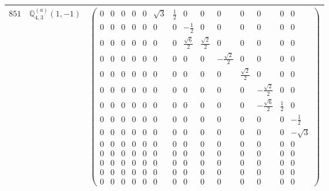 \documentclass[fleqn,8pt,landscape]{jsarticle}
\begin{document}
\begin{center}
\begin{longtable}{ccc}
$ 851 $ & $ \mathbb{Q}_{4,3}^{(a)}(1,-1) $ & $ \begin{pmatrix} 0 & 0 & 0 & 0 & 0 & \sqrt{3} & \frac{1}{2} & 0 & 0 & 0 & 0 & 0 & 0 & 0 \\ 0 & 0 & 0 & 0 & 0 & 0 & 0 & - \frac{1}{2} & 0 & 0 & 0 & 0 & 0 & 0 \\ 0 & 0 & 0 & 0 & 0 & 0 & 0 & \frac{\sqrt{6}}{2} & \frac{\sqrt{2}}{2} & 0 & 0 & 0 & 0 & 0 \\ 0 & 0 & 0 & 0 & 0 & 0 & 0 & 0 & 0 & - \frac{\sqrt{2}}{2} & 0 & 0 & 0 & 0 \\ 0 & 0 & 0 & 0 & 0 & 0 & 0 & 0 & 0 & 0 & \frac{\sqrt{2}}{2} & 0 & 0 & 0 \\ 0 & 0 & 0 & 0 & 0 & 0 & 0 & 0 & 0 & 0 & 0 & - \frac{\sqrt{2}}{2} & 0 & 0 \\ 0 & 0 & 0 & 0 & 0 & 0 & 0 & 0 & 0 & 0 & 0 & - \frac{\sqrt{6}}{2} & \frac{1}{2} & 0 \\ 0 & 0 & 0 & 0 & 0 & 0 & 0 & 0 & 0 & 0 & 0 & 0 & 0 & - \frac{1}{2} \\ 0 & 0 & 0 & 0 & 0 & 0 & 0 & 0 & 0 & 0 & 0 & 0 & 0 & - \sqrt{3} \\ 0 & 0 & 0 & 0 & 0 & 0 & 0 & 0 & 0 & 0 & 0 & 0 & 0 & 0 \\ 0 & 0 & 0 & 0 & 0 & 0 & 0 & 0 & 0 & 0 & 0 & 0 & 0 & 0 \\ 0 & 0 & 0 & 0 & 0 & 0 & 0 & 0 & 0 & 0 & 0 & 0 & 0 & 0 \\ 0 & 0 & 0 & 0 & 0 & 0 & 0 & 0 & 0 & 0 & 0 & 0 & 0 & 0 \\ 0 & 0 & 0 & 0 & 0 & 0 & 0 & 0 & 0 & 0 & 0 & 0 & 0 & 0 \end{pmatrix} $ \\ \hline

\end{longtable}
\end{center}
\end{document}
